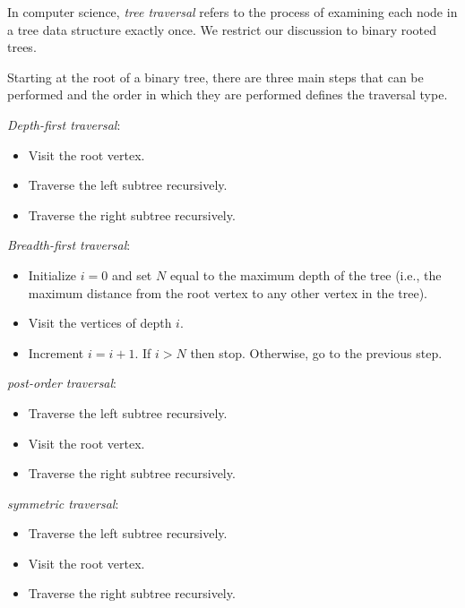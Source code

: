 In computer science, {\it tree traversal} refers to the process of
examining each node in a tree data structure exactly once.
We restrict our discussion to binary rooted trees.

Starting at the root of a binary tree, there are three main steps that
can be performed and the order in which they are performed defines the
traversal type.

\noindent
{\it Depth-first traversal}:
\begin{itemize}
\item
Visit the root vertex.

\item
Traverse the left subtree recursively.

\item
Traverse the right subtree recursively.

\end{itemize}


\noindent
{\it Breadth-first traversal}:
\begin{itemize}
\item
Initialize $i=0$ and set $N$ equal to the maximum depth
of the tree (i.e., the maximum distance from the root vertex
to any other vertex in the tree).

\item
Visit the vertices of depth $i$.

\item
Increment $i=i+1$. If $i>N$ then stop. Otherwise, go to
the previous step.

\end{itemize}


\noindent
{\it post-order traversal}:
\begin{itemize}
\item
Traverse the left subtree recursively.

\item
Visit the root vertex.

\item
Traverse the right subtree recursively.

\end{itemize}


\noindent
{\it symmetric traversal}:
\begin{itemize}
\item
Traverse the left subtree recursively.

\item
Visit the root vertex.

\item
Traverse the right subtree recursively.

\end{itemize}



